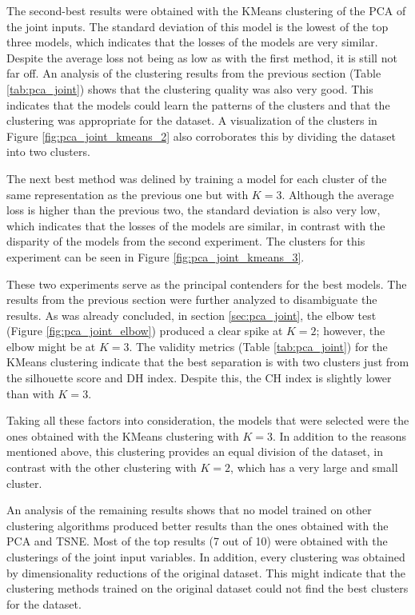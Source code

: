 The second-best results were obtained with the KMeans clustering of the PCA of the joint inputs. The standard deviation of this model is the lowest of the top three models, which indicates that the losses of the models are very similar. Despite the average loss not being as low as with the first method, it is still not far off. An analysis of the clustering results from the previous section (Table \ref{tab:pca_joint}) shows that the clustering quality was also very good. This indicates that the models could learn the patterns of the clusters and that the clustering was appropriate for the dataset. A visualization of the clusters in Figure \ref{fig:pca_joint_kmeans_2} also corroborates this by dividing the dataset into two clusters.

The next best method was delined by training a model for each cluster of the same representation as the previous one but with $K=3$. Although the average loss is higher than the previous two, the standard deviation is also very low, which indicates that the losses of the models are similar, in contrast with the disparity of the models from the second experiment. The clusters for this experiment can be seen in Figure \ref{fig:pca_joint_kmeans_3}.

These two experiments serve as the principal contenders for the best models. The results from the previous section were further analyzed to disambiguate the results. As was already concluded, in section \ref{sec:pca_joint}, the elbow test (Figure \ref{fig:pca_joint_elbow}) produced a clear spike at $K=2$; however, the elbow might be at $K=3$. The validity metrics (Table \ref{tab:pca_joint}) for the KMeans clustering indicate that the best separation is with two clusters just from the silhouette score and DH index. Despite this, the CH index is slightly lower than with $K=3$. 

Taking all these factors into consideration, the models that were selected were the ones obtained with the KMeans clustering with $K=3$. In addition to the reasons mentioned above, this clustering provides an equal division of the dataset, in contrast with the other clustering with $K=2$, which has a very large and small cluster.

An analysis of the remaining results shows that no model trained on other clustering algorithms produced better results than the ones obtained with the PCA and TSNE. Most of the top results (7 out of 10) were obtained with the clusterings of the joint input variables. In addition, every clustering was obtained by dimensionality reductions of the original dataset. This might indicate that the clustering methods trained on the original dataset could not find the best clusters for the dataset. 

